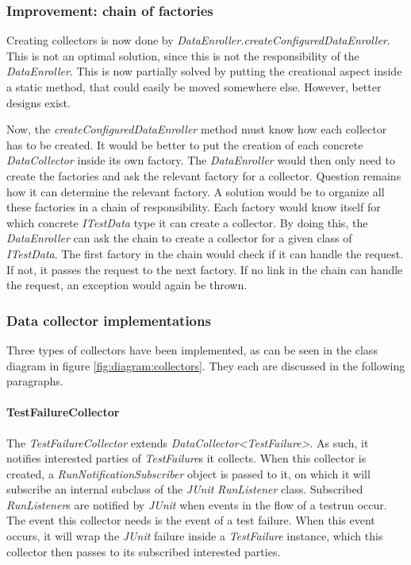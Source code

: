 \documentclass[i2]{oss}
\newcommand{\class}[1]{\emph{#1}}
\newcommand{\method}[1]{\emph{#1}}
\newcommand{\junit}{\emph{JUnit }}
\begin{document}
\subsubsection{Improvement: chain of factories}

Creating collectors is now done by \class{DataEnroller.createConfiguredDataEnroller}.
This is not an optimal solution, since this is not the responsibility of the \class{DataEnroller}.
This is now partially solved by putting the creational aspect inside a static method, that could easily be moved somewhere else.
However, better designs exist.

Now, the \method{createConfiguredDataEnroller} method must know how each collector has to be created.
It would be better to put the creation of each concrete \class{DataCollector} inside its own factory.
The \class{DataEnroller} would then only need to create the factories and ask the relevant factory for a collector.
Question remains how it can determine the relevant factory.
A solution would be to organize all these factories in a chain of responsibility.
Each factory would know itself for which concrete \class{ITestData} type it can create a collector.
By doing this, the \class{DataEnroller} can ask the chain to create a collector for a given class of \class{ITestData}.
The first factory in the chain would check if it can handle the request.
If not, it passes the request to the next factory.
If no link in the chain can handle the request, an exception would again be thrown.

\subsubsection{Data collector implementations}

Three types of collectors have been implemented, as can be seen in the class diagram in figure \ref{fig:diagram:collectors}.
They each are discussed in the following paragraphs.

\paragraph{TestFailureCollector} The \class{TestFailureCollector} extends \class{DataCollector<TestFailure>}.
As such, it notifies interested parties of \class{TestFailure}s it collects.
When this collector is created, a \class{RunNotificationSubscriber} object is passed to it, on which it will subscribe an internal subclass of the \junit \class{RunListener} class.
Subscribed \class{RunListener}s are notified by \junit when events in the flow of a testrun occur.
The event this collector needs is the event of a test failure.
When this event occurs, it will wrap the \junit failure inside a \class{TestFailure} instance, which this collector then passes to its subscribed interested parties.
\end{document}
